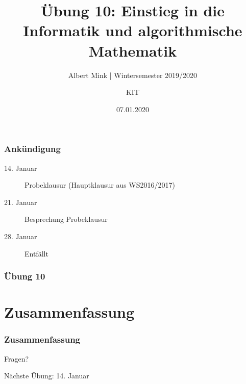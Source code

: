 \documentclass[c,18pt]{beamer}
\date{07.01.2020}
\title{Übung 10: Einstieg in die Informatik und algorithmische Mathematik}
\subtitle{Albert Mink | Wintersemester 2019/2020}
\author[Albert Mink, ]{KIT}
\institute[Institut für Angewandte und Numerische Mathematik (IANM)]{Institut für Angewandte und Numerische Mathematik}
\begin{document}
\begin{frame}
  \maketitle
\end{frame}



\begin{frame}
  \frametitle{Ankündigung}%
  
  \begin{description}
      \item[14. Januar] Probeklausur (Hauptklausur aus WS2016/2017)
      \item[21. Januar] Besprechung Probeklausur
      \item[28. Januar] Entfällt
  \end{description}
  \hfill
  
\end{frame}


\begin{frame}
  \frametitle{Übung 10}%
\tableofcontents[hideallsubsections]
\end{frame}


\setcounter{exercise}{29}
\setcounter{exercise}{30}

\section{Zusammenfassung}
\begin{frame}
  \frametitle{Zusammenfassung}%
\tableofcontents[hideallsubsections]
\end{frame}

\begin{frame}
\centering
\Huge\textcolor{KITgreen}{Fragen?}
\vspace{2cm}

{\LARGE
N\"achste \"Ubung: 14. Januar
}
\end{frame}


\end{document}
